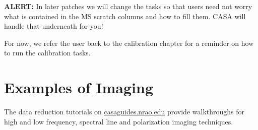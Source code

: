 {\bf ALERT:} In later patches we
will change the tasks so that users need not worry what is contained in
the MS scratch columns and how to fill them.  CASA will handle that 
underneath for you!

For now, we refer the user back to the calibration chapter for
a reminder on how to run the calibration tasks. 


\section{Examples of Imaging}
\label{section:im.examples}

The data reduction tutorials on \url{casaguides.nrao.edu} provide
walkthroughs for
high and low frequency, spectral line and polarization imaging techniques. 

